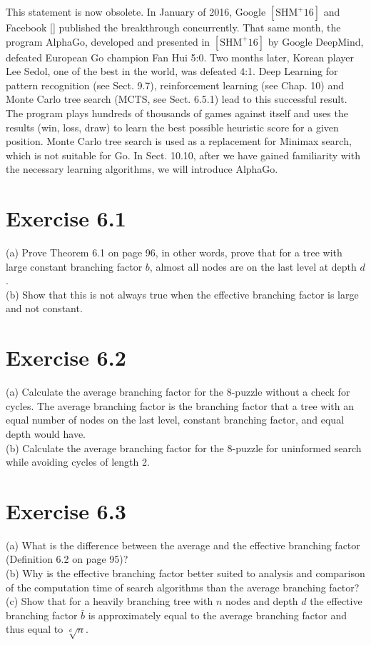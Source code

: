 \documentclass[10pt]{book}
\begin{document}
This statement is now obsolete. In January of 2016, Google $[\mathrm{SHM}^{+}16]$ and Facebook [\cite{tian2016goplayer}] published the breakthrough concurrently. That same month, the program AlphaGo, developed and presented in $[\mathrm{SHM}^{+}16]$ by Google DeepMind, defeated European Go champion Fan Hui 5:0. Two months later, Korean player Lee Sedol, one of the best in the world, was defeated 4:1. Deep Learning for pattern recognition (see Sect. 9.7), reinforcement learning (see Chap. 10) and Monte Carlo tree search (MCTS, see Sect. 6.5.1) lead to this successful result.
The program plays hundreds of thousands of games against itself and uses the results (win, loss, draw) to learn the best possible heuristic score for a given position. Monte Carlo tree search is used as a replacement for Minimax search, which is not suitable for Go. In Sect. 10.10, after we have gained familiarity with the necessary learning algorithms, we will introduce AlphaGo.

\section{Exercise 6.1}
(a) Prove Theorem 6.1 on page 96, in other words, prove that for a tree with large constant branching factor $b$, almost all nodes are on the last level at depth $d$.\\
(b) Show that this is not always true when the effective branching factor is large and not constant.

\section{Exercise 6.2}
(a) Calculate the average branching factor for the 8-puzzle without a check for cycles. The average branching factor is the branching factor that a tree with an equal number of nodes on the last level, constant branching factor, and equal depth would have.\\
(b) Calculate the average branching factor for the 8-puzzle for uninformed search while avoiding cycles of length 2.

\section{Exercise 6.3}
(a) What is the difference between the average and the effective branching factor (Definition 6.2 on page 95)?\\
(b) Why is the effective branching factor better suited to analysis and comparison of the computation time of search algorithms than the average branching factor?\\
(c) Show that for a heavily branching tree with $n$ nodes and depth $d$ the effective branching factor $\bar{b}$ is approximately equal to the average branching factor and thus equal to $\sqrt[d]{n}$.
\end{document}
